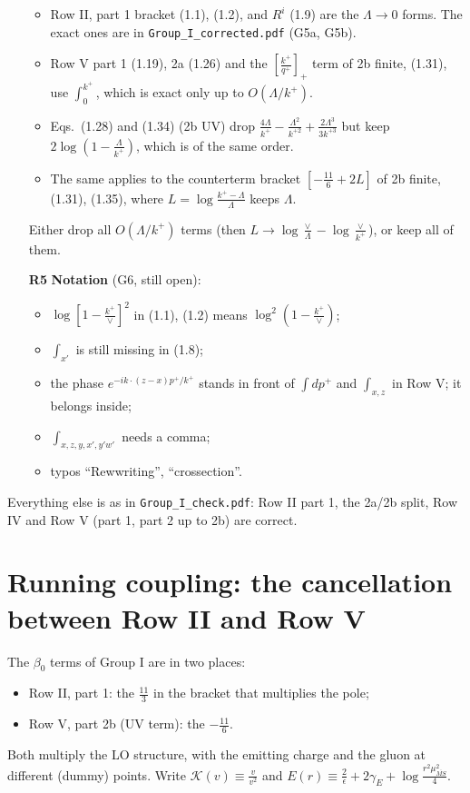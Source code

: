 \documentclass[10pt]{article}
\numberwithin{equation}{section}
\begin{document}
\begin{enumerate}
\begin{itemize}
\item Row II, part 1 bracket (1.1), (1.2), and $R^i$ (1.9) are the $\Lambda\to0$ forms. The exact ones are in \texttt{Group\_I\_corrected.pdf} (G5a, G5b).
\item Row V part 1 (1.19), 2a (1.26) and the $[\frac{k^+}{q^+}]_+$ term of 2b finite, (1.31), use $\int_0^{k^+}$, which is exact only up to $O(\Lambda/k^+)$.
\item Eqs.~(1.28) and (1.34) (2b UV) drop $\frac{4\Lambda}{k^+}-\frac{\Lambda^2}{k^{+2}}+\frac{2\Lambda^3}{3k^{+3}}$ but keep $2\log(1-\frac{\Lambda}{k^+})$, which is of the same order.
\item The same applies to the counterterm bracket $[-\frac{11}{6}+2L]$ of 2b finite, (1.31), (1.35), where $L=\log\frac{k^+-\Lambda}{\Lambda}$ keeps $\Lambda$.
\end{itemize}
Either drop all $O(\Lambda/k^+)$ terms (then $L\to\log\frac{\vee}{\Lambda}-\log\frac{\vee}{k^+}$), or keep all of them.
\item[\textbf{R5}] \textbf{Notation} (G6, still open):
\begin{itemize}
\item $\log[1-\frac{k^+}{\vee}]^2$ in (1.1), (1.2) means $\log^2(1-\frac{k^+}{\vee})$;
\item $\int_{x'}$ is still missing in (1.8);
\item the phase $e^{-ik\cdot(z-x)p^+/k^+}$ stands in front of $\int dp^+$ and $\int_{x,z}$ in Row V; it belongs inside;
\item $\int_{x,z,y,x',y'w'}$ needs a comma;
\item typos ``Rewwriting'', ``crossection''.
\end{itemize}
\end{enumerate}
Everything else is as in \texttt{Group\_I\_check.pdf}: Row II part 1, the 2a/2b split, Row IV and Row V (part 1, part 2 up to 2b) are correct.

\section{Running coupling: the cancellation between Row II and Row V}\label{sec:rc}
The $\beta_0$ terms of Group I are in two places:
\begin{itemize}
\item Row II, part 1: the $\frac{11}{3}$ in the bracket that multiplies the pole;
\item Row V, part 2b (UV term): the $-\frac{11}{6}$.
\end{itemize}
Both multiply the LO structure, with the emitting charge and the gluon at different (dummy) points. Write $\mathcal K(v)\equiv\frac{v}{v^2}$ and $E(r)\equiv\frac{2}{\epsilon}+2\gamma_E+\log\frac{r^2\mu^2_{\overline{MS}}}{4}$.
\end{document}
